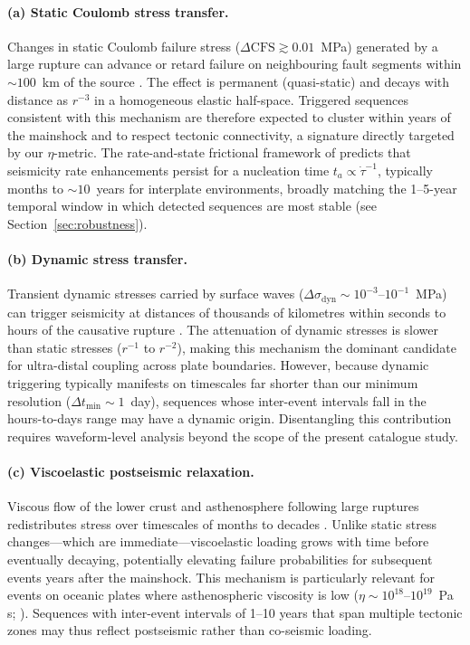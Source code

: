 \documentclass[draft]{agujournal2019}
\begin{document}
\paragraph{(a) Static Coulomb stress transfer.}
Changes in static Coulomb failure stress ($\Delta\mathrm{CFS} \gtrsim
0.01$~MPa) generated by a large rupture can advance or retard failure on
neighbouring fault segments within $\sim\!100$~km of the source
\citep{King1994, Stein1999}.  The effect is permanent (quasi-static)
and decays with distance as $r^{-3}$ in a homogeneous elastic half-space.
Triggered sequences consistent with this mechanism are therefore expected
to cluster within years of the mainshock and to respect tectonic
connectivity, a signature directly targeted by our $\eta$-metric.  The
rate-and-state frictional framework of \citet{Dieterich1994} predicts
that seismicity rate enhancements persist for a nucleation time
$t_a \propto \dot{\tau}^{-1}$, typically months to $\sim\!10$~years for
interplate environments, broadly matching the 1--5-year temporal window in
which detected sequences are most stable (see Section~\ref{sec:robustness}).

\paragraph{(b) Dynamic stress transfer.}
Transient dynamic stresses carried by surface waves ($\Delta\sigma_\mathrm{dyn}
\sim 10^{-3}$--$10^{-1}$~MPa) can trigger seismicity at distances of
thousands of kilometres within seconds to hours of the causative rupture
\citep{Hill1993, Gomberg2001, Brodsky2006}.  The attenuation of dynamic
stresses is slower than static stresses ($r^{-1}$ to $r^{-2}$), making
this mechanism the dominant candidate for ultra-distal coupling across
plate boundaries.  However, because dynamic triggering typically manifests
on timescales far shorter than our minimum resolution ($\Delta t_{\min}
\sim 1$~day), sequences whose inter-event intervals fall in the hours-to-days
range may have a dynamic origin.  Disentangling this contribution requires
waveform-level analysis beyond the scope of the present catalogue study.

\paragraph{(c) Viscoelastic postseismic relaxation.}
Viscous flow of the lower crust and asthenosphere following large
ruptures redistributes stress over timescales of months to decades
\citep{Pollitz1998, Freed2001, Freed2005}.  Unlike static stress
changes---which are immediate---viscoelastic loading grows with time before
eventually decaying, potentially elevating failure probabilities for
subsequent events years after the mainshock.  This mechanism is
particularly relevant for events on oceanic plates where asthenospheric
viscosity is low ($\eta \sim 10^{18}$--$10^{19}$~Pa\,s;
\citealt{Pollitz1998}).  Sequences with inter-event intervals of 1--10
years that span multiple tectonic zones may thus reflect postseismic
rather than co-seismic loading.
\end{document}
